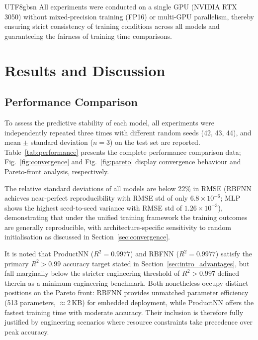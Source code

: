 \documentclass[a4paper,12pt]{report}
\begin{document}
\begin{CJK}{UTF8}{gbsn}
All experiments were conducted on a single GPU (NVIDIA RTX 3050) without mixed-precision
training (FP16) or multi-GPU parallelism, thereby ensuring strict consistency of training
conditions across all models and guaranteeing the fairness of training time comparisons.

\chapter{Results and Discussion}
\label{chap:results}

\section{Performance Comparison}
\label{sec:performance}

To assess the predictive stability of each model, all experiments were independently
repeated three times with different random seeds (42, 43, 44), and mean $\pm$ standard
deviation ($n = 3$) on the test set are reported. Table~\ref{tab:performance} presents
the complete performance comparison data; Fig.~\ref{fig:convergence} and
Fig.~\ref{fig:pareto} display convergence behaviour and Pareto-front analysis,
respectively.

The relative standard deviations of all models are below 22\% in RMSE
(RBFNN achieves near-perfect reproducibility with RMSE std of only $6.8\times10^{-6}$;
MLP shows the highest seed-to-seed variance with RMSE std of $1.26\times10^{-3}$),
demonstrating that under the unified training framework the training outcomes are
generally reproducible, with architecture-specific sensitivity to random initialisation
as discussed in Section~\ref{sec:convergence}.

It is noted that ProductNN ($R^2 = 0.9977$) and RBFNN ($R^2 = 0.9977$) satisfy the
primary $R^2 > 0.99$ accuracy target stated in Section~\ref{sec:intro_advantages}, but fall
marginally below the stricter engineering threshold of $R^2 > 0.997$ defined therein
as a minimum engineering benchmark. Both nonetheless occupy distinct positions on the Pareto front:
RBFNN provides unmatched parameter efficiency (513 parameters, $\approx$2\,KB) for
embedded deployment, while ProductNN offers the fastest training time with moderate
accuracy. Their inclusion is therefore fully justified by engineering scenarios where
resource constraints take precedence over peak accuracy.


\end{CJK}
\end{document}
